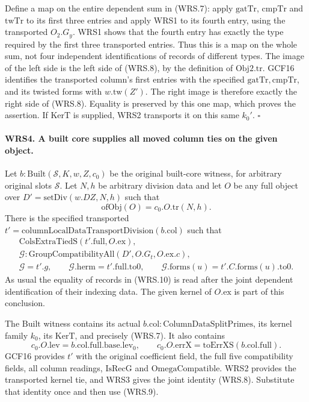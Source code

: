\documentclass[11pt,a4paper]{article}
\numberwithin{equation}{section}
\theoremstyle{remark}\newtheorem{remark}[theorem]{Remark}
\begin{document}
Define a map on the entire dependent sum in (WRS.7): apply
\(\mathrm{gatTr}\), \(\mathrm{cmpTr}\) and
\(\mathrm{twTr}\) to its first three entries and apply WRS1 to
its fourth entry, using the transported \(O_2.G_y\).  WRS1 shows
that the fourth entry has exactly the type required by the first
three transported entries.  Thus this is a map on the whole sum,
not four independent identifications of records of different types.
The image of the left side is the left side of (WRS.8), by the
definition of \(\mathrm{Obj2.tr}\).  GCF16 identifies the
transported column's first entries with the specified
\(\mathrm{gatTr},\mathrm{cmpTr}\), and its twisted forms with
\(w.\mathrm{tw}(Z')\).  The right image is therefore exactly the
right side of (WRS.8).  Equality is preserved by this one map,
which proves the assertion.  If \(\mathrm{KerT}\) is supplied,
WRS2 transports it on this same \(k_0'\).
\hfill\(\square\)

\paragraph{WRS4. A built core supplies all moved column ties on the given object.}
\label{claim:WRS4}
Let \(b:\mathrm{Built}(\mathcal S,K,w,Z,c_0)\) be the original
built-core witness, for arbitrary original slots \(\mathcal S\).
Let \(N,h\) be arbitrary division data and let \(O\) be any full
object over \(D'=\mathrm{setDiv}(w.DZ,N,h)\) such that
\[
             \mathrm{ofObj}(O)=c_0.O.\mathrm{tr}(N,h).
 \tag{WRS.9}
\]
There is the specified transported
\(t'=\mathrm{columnLocalDataTransportDivision}(b.\mathrm{col})\)
such that
\[
 \begin{gathered}
 \mathrm{ColsExtraTiedS}(t'.\mathrm{full},O.\mathrm{ex}),\\
 \mathcal G:\mathrm{GroupCompatibilityAll}
             (D',O.G_t,O.\mathrm{ex}.c),\\
 \mathcal G=t'.g,\qquad
 \mathcal G.\mathrm{herm}=t'.\mathrm{full}.\mathrm{to0},\qquad
 \mathcal G.\mathrm{forms}(u)=t'.C.\mathrm{forms}(u).\mathrm{to0}.
 \end{gathered}                                                   \tag{WRS.10}
\]
As usual the equality of records in (WRS.10) is read after the
joint dependent identification of their indexing data.  The given
kernel of \(O.\mathrm{ex}\) is part of this conclusion.

The \(\mathrm{Built}\) witness contains its actual
\(b.\mathrm{col}:\mathrm{ColumnDataSplitPrimes}\), its kernel
family \(k_0\), its \(\mathrm{KerT}\), and precisely (WRS.7).
It also contains
\[
 c_0.O.\mathrm{lev}=b.\mathrm{col.full.base.lev}_0,
 \qquad c_0.O.\mathrm{errX}=\mathrm{toErrXS}(b.\mathrm{col.full}).
 \tag{WRS.11}
\]
GCF16 provides \(t'\) with the original coefficient field, the
full five compatibility fields, all column readings, \(\mathrm{IsRecG}\)
and \(\mathrm{OmegaCompatible}\).  WRS2 provides the transported
kernel tie, and WRS3 gives the joint identity (WRS.8).
Substitute that identity once and then use (WRS.9).
\end{document}
